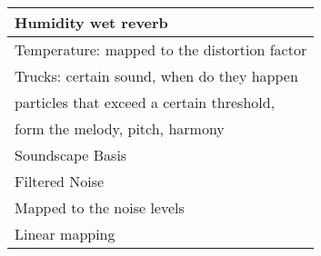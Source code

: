 \documentclass[11pt]{article}
\author{Jason SK}
\date{\today}
\title{}
\begin{document}
\begin{center}
\begin{tabular}{l}
\hline
Humidity wet reverb\\
\hline
Temperature: mapped to the distortion factor\\
\hline
Trucks: certain sound, when do they happen\\
\hline
particles that exceed a certain threshold,\\
form the melody, pitch, harmony\\
\hline
Soundscape Basis\\
Filtered Noise\\
Mapped to the noise levels\\
Linear mapping\\
\hline
\end{tabular}
\end{center}
\end{document}
